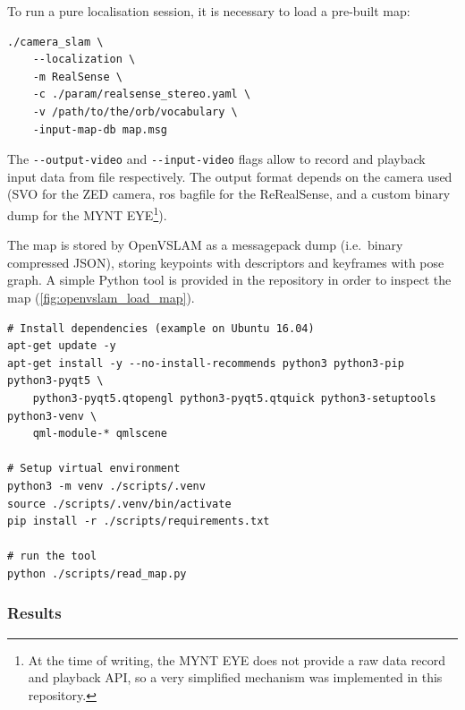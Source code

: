 \documentclass[11pt, letterpaper, twoside]{article}
\begin{document}
To run a pure localisation session, it is necessary to load a pre-built map:

\begin{verbatim}
./camera_slam \
    --localization \
    -m RealSense \
    -c ./param/realsense_stereo.yaml \
    -v /path/to/the/orb/vocabulary \
    -input-map-db map.msg
\end{verbatim}

The \texttt{-{}-output-video} and \texttt{-{}-input-video} flags allow to
record and playback input data from file respectively. The output format
depends on the camera used (SVO for the ZED camera, \gls{ros} bagfile for the
ReRealSense, and a custom binary dump for the MYNT EYE\footnote{At the time of
writing, the MYNT EYE does not provide a raw data record and playback API,
so a very simplified mechanism was implemented in this repository.}).

The map is stored by OpenVSLAM as a messagepack dump (i.e.\ binary compressed
JSON), storing keypoints with descriptors and keyframes with pose graph. A
simple Python tool is provided in the repository in order to inspect the map
(\cref{fig:openvslam_load_map}).

\begin{verbatim}
# Install dependencies (example on Ubuntu 16.04)
apt-get update -y
apt-get install -y --no-install-recommends python3 python3-pip python3-pyqt5 \
    python3-pyqt5.qtopengl python3-pyqt5.qtquick python3-setuptools python3-venv \
    qml-module-* qmlscene

# Setup virtual environment
python3 -m venv ./scripts/.venv
source ./scripts/.venv/bin/activate
pip install -r ./scripts/requirements.txt

# run the tool
python ./scripts/read_map.py
\end{verbatim}

\subsubsection{Results}


\end{document}
